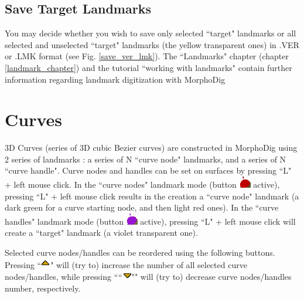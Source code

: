 \subsection{Save Target Landmarks}
You may decide whether you wish to save only selected ``target" landmarks or all selected and
unselected ``target" landmarks (the yellow transparent ones) in .VER or .LMK format (see Fig. \ref{save_ver_lmk}).
The ``Landmarks" chapter (chapter \ref{landmark_chapter}) and the tutorial ``working with landmarks" contain further information regarding landmark digitization with MorphoDig


\section{Curves}\label{file_curve_section}

3D Curves (series of 3D cubic Bezier curves) are constructed in MorphoDig using 2 series of landmarks : a series of N ``curve node" landmarks, and a series of N ``curve handle".  Curve nodes and handles can be set on surfaces by pressing ``L" + left mouse click. In the ``curve nodes" landmark mode (button \includegraphics[scale=0.7]{images/04/curve_nodes.png} active), pressing ``L" + left mouse click results in the creation a ``curve node" landmark (a dark green for a curve starting node, and then light red ones). In the ``curve handles" landmark mode (button \includegraphics[scale=0.7]{images/04/curve_handles.png} active), pressing ``L" + left mouse click will create a ``target" landmark (a violet transparent one).

Selected curve nodes/handles can be reordered using the following buttons. Pressing ``\includegraphics[scale=0.7]{images/06/objects/move_up.png}"
will (try to) increase the number of all selected curve nodes/handles, while pressing ````\includegraphics[scale=0.7]{images/06/objects/move_down.png}""
will (try to) decrease curve nodes/handles number, respectively.\\


